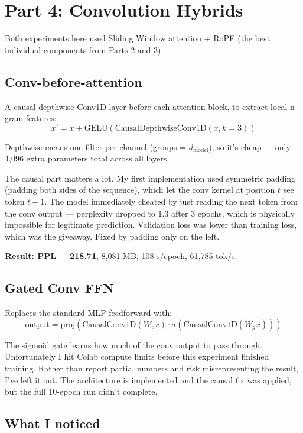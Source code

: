 \documentclass[12pt,a4paper]{article}
\begin{document}
\section{Part 4: Convolution Hybrids}

Both experiments here used Sliding Window attention + RoPE (the best individual components from Parts 2 and 3).

\subsection{Conv-before-attention}

A causal depthwise Conv1D layer before each attention block, to extract local n-gram features:
\[x' = x + \text{GELU}(\text{CausalDepthwiseConv1D}(x, k=3))\]

Depthwise means one filter per channel (groups = $d_{\text{model}}$), so it's cheap — only 4,096 extra parameters total across all layers.

The causal part matters a lot. My first implementation used symmetric padding (padding both sides of the sequence), which let the conv kernel at position $t$ see token $t+1$. The model immediately cheated by just reading the next token from the conv output — perplexity dropped to 1.3 after 3 epochs, which is physically impossible for legitimate prediction. Validation loss was lower than training loss, which was the giveaway. Fixed by padding only on the left.

\textbf{Result: PPL = 218.71}, 8,081 MB, 108 s/epoch, 61,785 tok/s.

\subsection{Gated Conv FFN}

Replaces the standard MLP feedforward with:
\[\text{output} = \text{proj}\!\left(\text{CausalConv1D}(W_v x) \cdot \sigma(\text{CausalConv1D}(W_g x))\right)\]

The sigmoid gate learns how much of the conv output to pass through. Unfortunately I hit Colab compute limits before this experiment finished training. Rather than report partial numbers and risk misrepresenting the result, I've left it out. The architecture is implemented and the causal fix was applied, but the full 10-epoch run didn't complete.

\subsection{What I noticed}
\end{document}
